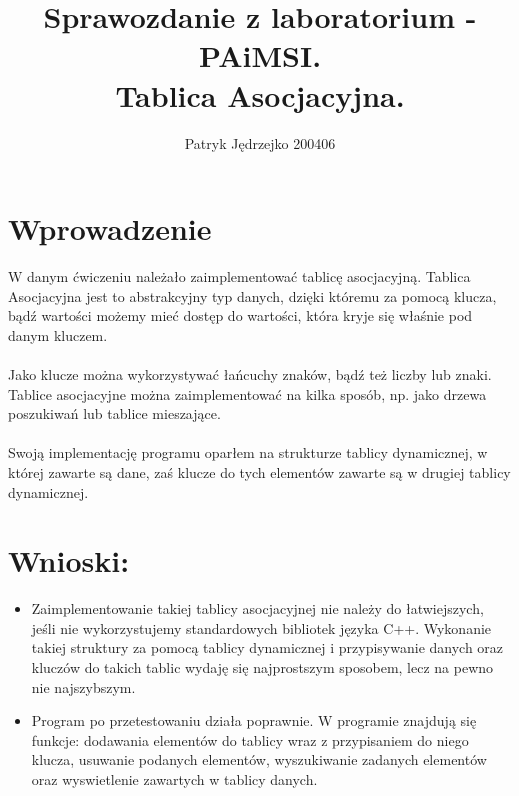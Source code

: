 \documentclass{article}
\author{Patryk Jędrzejko 200406}
\title{Sprawozdanie z laboratorium - PAiMSI. \\Tablica Asocjacyjna.}
\begin{document}
\maketitle

\section{Wprowadzenie}

W danym ćwiczeniu należało zaimplementować tablicę asocjacyjną. Tablica Asocjacyjna jest to abstrakcyjny typ danych, dzięki któremu za pomocą klucza, bądź wartości możemy mieć dostęp do wartości, która kryje się właśnie pod danym kluczem.
\\\\Jako klucze można wykorzystywać łańcuchy znaków, bądź też liczby lub znaki. Tablice asocjacyjne można zaimplementować na kilka sposób, np. jako drzewa poszukiwań lub tablice mieszające.
\\\\Swoją implementację programu oparłem na strukturze tablicy dynamicznej, w której zawarte są dane, zaś klucze do tych elementów zawarte są w drugiej tablicy dynamicznej.

\section{Wnioski:}
\begin{itemize}
  \item Zaimplementowanie takiej tablicy asocjacyjnej nie należy do łatwiejszych, jeśli nie wykorzystujemy standardowych bibliotek języka C++. Wykonanie takiej struktury za pomocą tablicy dynamicznej i przypisywanie danych oraz kluczów do takich tablic wydaję się najprostszym sposobem, lecz na pewno nie najszybszym.
  \item Program po przetestowaniu działa poprawnie. W programie znajdują się funkcje: dodawania elementów do tablicy wraz z przypisaniem do niego klucza, usuwanie podanych elementów, wyszukiwanie zadanych elementów oraz wyswietlenie zawartych w tablicy danych. 
\end{itemize}
\end{document}
